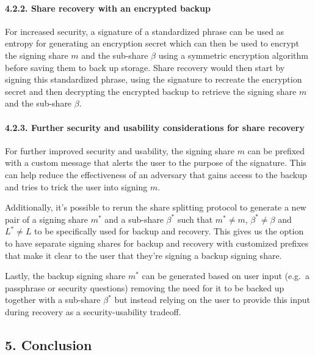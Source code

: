 \documentclass[
]{article}
\begin{document}
\hypertarget{share-recovery-backup-encrypted}{%
\paragraph{4.2.2. Share recovery with an encrypted
backup}\label{share-recovery-backup-encrypted}}

For increased security, a signature of a standardized phrase can be used
as entropy for generating an encryption secret which can then be used to
encrypt the signing share \(m\) and the sub-share \(\beta\) using a
symmetric encryption algorithm before saving them to back up storage.
Share recovery would then start by signing this standardized phrase,
using the signature to recreate the encryption secret and then
decrypting the encrypted backup to retrieve the signing share \(m\) and
the sub-share \(\beta\).

\hypertarget{share-recovery-backup-enhancements}{%
\paragraph{4.2.3. Further security and usability considerations for
share recovery}\label{share-recovery-backup-enhancements}}

For further improved security and usability, the signing share \(m\) can
be prefixed with a custom message that alerts the user to the purpose of
the signature. This can help reduce the effectiveness of an adversary
that gains access to the backup and tries to trick the user into signing
\(m\).

Additionally, it's possible to rerun the share splitting protocol to
generate a new pair of a signing share \(m^ \ast\) and a sub-share
\(\beta ^ \ast\) such that \(m^ \ast \neq m\),
\(\beta ^ \ast \neq \beta\) and \(L^ \ast \neq L\) to be specifically
used for backup and recovery. This gives us the option to have separate
signing shares for backup and recovery with customized prefixes that
make it clear to the user that they're signing a backup signing share.

Lastly, the backup signing share \(m^ \ast\) can be generated based on
user input (e.g.~a passphrase or security questions) removing the need
for it to be backed up together with a sub-share \(\beta ^ \ast\) but
instead relying on the user to provide this input during recovery as a
security-usability tradeoff.

\hypertarget{conclusion}{%
\subsection{5. Conclusion}\label{conclusion}}
\end{document}
